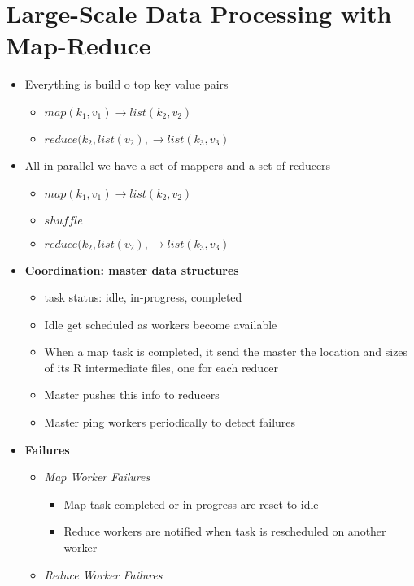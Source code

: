 \documentclass[12pt,oneside]{report}
\begin{document}
\chapter{Large-Scale Data Processing with Map-Reduce}
\begin{itemize}
    \item Everything is build o top key value pairs\
    \begin{itemize}
        \item \(map(k_1, v_1) \rightarrow list(k_2, v_2)\)
        \item \(reduce(k_2, list(v_2), \rightarrow list(k_3, v_3)\)
    \end{itemize}
    \item All in parallel we have a set of mappers and a set of reducers
    \begin{itemize}
        \item \(map(k_1, v_1) \rightarrow list(k_2, v_2)\)
        \item \(shuffle\)
        \item \(reduce(k_2, list(v_2), \rightarrow list(k_3, v_3)\)
    \end{itemize}
    \item \textbf{Coordination: master data structures}
    \begin{itemize}
        \item task status: idle, in-progress, completed
        \item Idle get scheduled as workers become available
        \item When a map task is completed, it send the master the location and sizes of its R intermediate files, one for each reducer
        \item Master pushes this info to reducers
        \item Master ping workers periodically to detect failures
    \end{itemize}
    \item \textbf{Failures}
    \begin{itemize}
        \item \textit{Map Worker Failures}
        \begin{itemize}
            \item Map task completed or in progress are reset to idle
            \item Reduce workers are notified when task is rescheduled on another worker 
        \end{itemize}
        \item \textit{Reduce Worker Failures}

\end{itemize}
\end{itemize}
\end{document}
